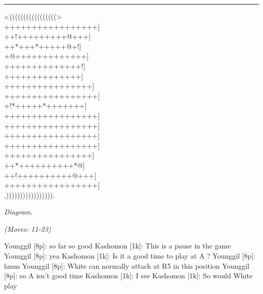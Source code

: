 \documentclass[letterpaper,12pt]{memoir}
\newcounter{GoFigure}[part]
\newcommand{\gofigure}{%
 \stepcounter{GoFigure}
 \centerline{\textit{Diagram.\thinspace\arabic{GoFigure}}}
}
\newcommand{\subtext}[1]{\centerline{\textit{#1}}}
\begin{document}
\rule{\textwidth}{0.5pt}

\begin{minipage}[t]{240pt}
{\gnos
<(((((((((((((((((>\\
+++++++++++++++++]\\
++!+++++++++@+++]\\
++*+++*+++++@+!]\\
+@+++++++++++++]\\
++++++++++++++!]\\
++++++++++++++]\\
++++++++++++++++]\\
+++++++++++++++++]\\
+!*+++++*+++++++]\\
+++++++++++++++++]\\
+++++++++++++++++]\\
+++++++++++++++++]\\
+++++++++++++++++]\\
++++++++++++++++]\\
++*++++++++++*@]\\
++!++++++++++@+++]\\
+++++++++++++++++]\\
,))))))))))))))))).\\
}
\gofigure

\subtext{(Moves: 11-23)}
\end{minipage}
\begin{minipage}[t]{268.19999999999993pt}
\setlength{\parskip}{0.5em}
Younggil [8p]: so far so good
Kashomon [1k]: This is a pause in the game
Younggil [8p]: yea
Kashomon [1k]: Is it a good time to play at A ? 
Younggil [8p]: hmm
Younggil [8p]: White can normally attach at R5 in this position
Younggil [8p]: so A isn't good time
Kashomon [1k]: I see
Kashomon [1k]: So would White play


\end{minipage}
\vfill
\end{document}
